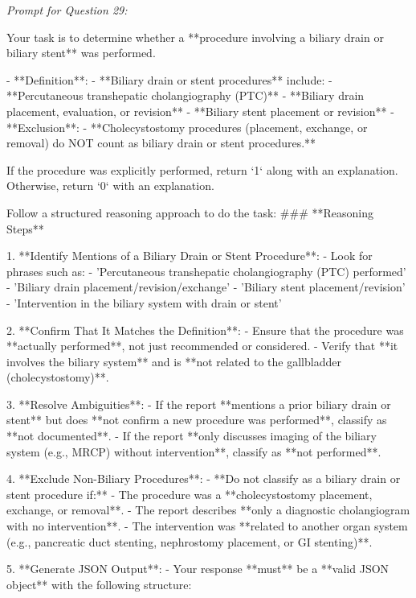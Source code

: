 \textit{\normalsize Prompt for Question  29:}
\begin{mdframed}[]
\normalsize

Your task is to determine whether a **procedure involving a biliary drain or biliary stent** was performed.  

- **Definition**:  
  - **Biliary drain or stent procedures** include:  
    - **Percutaneous transhepatic cholangiography (PTC)**  
    - **Biliary drain placement, evaluation, or revision**  
    - **Biliary stent placement or revision**  
  - **Exclusion**:  
    - **Cholecystostomy procedures (placement, exchange, or removal) do NOT count as biliary drain or stent procedures.**  

If the procedure was explicitly performed, return `1` along with an explanation. Otherwise, return `0` with an explanation.

Follow a structured reasoning approach to do the task:
### **Reasoning Steps**  

1. **Identify Mentions of a Biliary Drain or Stent Procedure**:  
   - Look for phrases such as:  
     - 'Percutaneous transhepatic cholangiography (PTC) performed'  
     - 'Biliary drain placement/revision/exchange'  
     - 'Biliary stent placement/revision'  
     - 'Intervention in the biliary system with drain or stent'  

2. **Confirm That It Matches the Definition**:  
   - Ensure that the procedure was **actually performed**, not just recommended or considered.  
   - Verify that **it involves the biliary system** and is **not related to the gallbladder (cholecystostomy)**.  

3. **Resolve Ambiguities**:  
   - If the report **mentions a prior biliary drain or stent** but does **not confirm a new procedure was performed**, classify as **not documented**.  
   - If the report **only discusses imaging of the biliary system (e.g., MRCP) without intervention**, classify as **not performed**.  

4. **Exclude Non-Biliary Procedures**:  
   - **Do not classify as a biliary drain or stent procedure if:**  
     - The procedure was a **cholecystostomy placement, exchange, or removal**.  
     - The report describes **only a diagnostic cholangiogram with no intervention**.  
     - The intervention was **related to another organ system (e.g., pancreatic duct stenting, nephrostomy placement, or GI stenting)**.  

5. **Generate JSON Output**:  
   - Your response **must** be a **valid JSON object** with the following structure:  

\end{mdframed}

